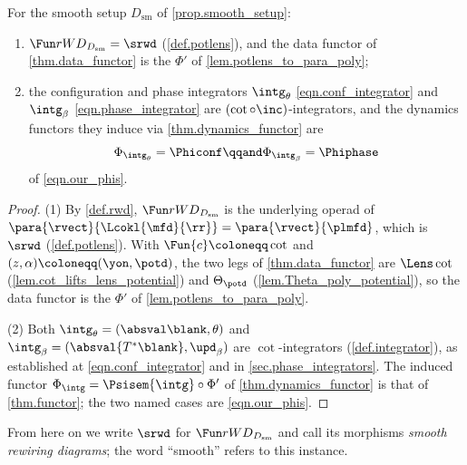 \begin{theorem}[Recovery]\label{thm.recovery}
For the smooth setup $D_{\mathrm{sm}}$ of \cref{prop.smooth_setup}:
\begin{enumerate}
  \item $\rwd_{D_{\mathrm{sm}}}=\srwd$ (\cref{def.potlens}), and the data functor of
    \cref{thm.data_functor} is the $\Phi'$ of \cref{lem.potlens_to_para_poly};
  \item the configuration and phase integrators $\intg_\theta$
    \eqref{eqn.conf_integrator} and $\intg_\beta$ \eqref{eqn.phase_integrator} are
    $(\cot\circ\inc)$-integrators, and the dynamics functors they induce via
    \cref{thm.dynamics_functor} are
    \[
      \Phi_{\intg_\theta}=\Phiconf
      \qqand
      \Phi_{\intg_\beta}=\Phiphase
    \]
    of \eqref{eqn.our_phis}.
\end{enumerate}
\end{theorem}

\begin{proof}
(1) By \cref{def.rwd}, $\rwd_{D_{\mathrm{sm}}}$ is the underlying operad of
$\para{\rvect}{\Lcokl{\mfd}{\rr}}=\para{\rvect}{\plmfd}$, which is $\srwd$
(\cref{def.potlens}). With $\Fun{c}\coloneqq\cot$ and $(z,\alpha)\coloneqq(\yon,\potd)$,
the two legs of \cref{thm.data_functor} are $\Lens\cot$
(\cref{lem.cot_lifts_lens_potential}) and $\Theta_\potd$
(\cref{lem.Theta_poly_potential}), so the data functor is the $\Phi'$ of
\cref{lem.potlens_to_para_poly}.

(2) Both $\intg_\theta=(\absval\blank,\theta)$ and
$\intg_\beta=(\absval{T^*\blank},\upd_\beta)$ are $\cot$-integrators
(\cref{def.integrator}), as established at \eqref{eqn.conf_integrator} and in
\cref{sec.phase_integrators}. The induced functor
$\Phi_{\intg}=\Psisem{\intg}\circ\Phi'$ of \cref{thm.dynamics_functor} is that of
\cref{thm.functor}; the two named cases are \eqref{eqn.our_phis}.
\qedhere
\end{proof}

From here on we write $\srwd$ for $\rwd_{D_{\mathrm{sm}}}$ and call its morphisms
\emph{smooth rewiring diagrams}; the word ``smooth'' refers to this instance.
